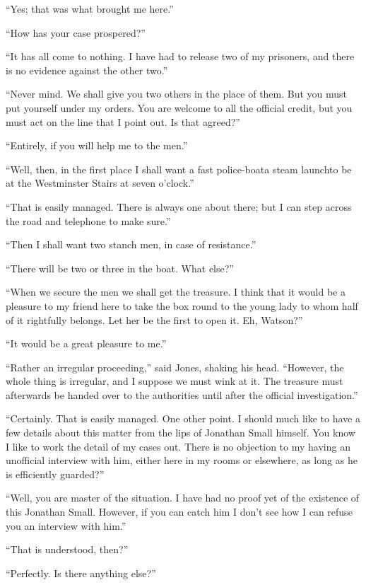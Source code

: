 \documentclass[12pt,english,oneside]{book}
\begin{document}
{}``Yes; that was what brought me here.''

{}``How has your case prospered?''

{}``It has all come to nothing. I have had to release two of my prisoners,
and there is no evidence against the other two.''

{}``Never mind. We shall give you two others in the place of them.
But you must put yourself under my orders. You are welcome to all
the official credit, but you must act on the line that I point out.
Is that agreed?''

{}``Entirely, if you will help me to the men.''

{}``Well, then, in the first place I shall want a fast police-boat\mdsh{---}a
steam launch\mdsh{---}to be at the Westminster Stairs at seven o'clock.''

{}``That is easily managed. There is always one about there; but
I can step across the road and telephone to make sure.''

{}``Then I shall want two stanch men, in case of resistance.''

{}``There will be two or three in the boat. What else?''

{}``When we secure the men we shall get the treasure. I think that
it would be a pleasure to my friend here to take the box round to
the young lady to whom half of it rightfully belongs. Let her be the
first to open it.\mdsh{---} Eh, Watson?''

{}``It would be a great pleasure to me.''

{}``Rather an irregular proceeding,'' said Jones, shaking his head.
{}``However, the whole thing is irregular, and I suppose we must
wink at it. The treasure must afterwards be handed over to the authorities
until after the official investigation.''

{}``Certainly. That is easily managed. One other point. I should
much like to have a few details about this matter from the lips of
Jonathan Small himself. You know I like to work the detail of my cases
out. There is no objection to my having an unofficial interview with
him, either here in my rooms or elsewhere, as long as he is efficiently
guarded?''

{}``Well, you are master of the situation. I have had no proof yet
of the existence of this Jonathan Small. However, if you can catch
him I don't see how I can refuse you an interview with him.''

{}``That is understood, then?''

{}``Perfectly. Is there anything else?''
\end{document}
